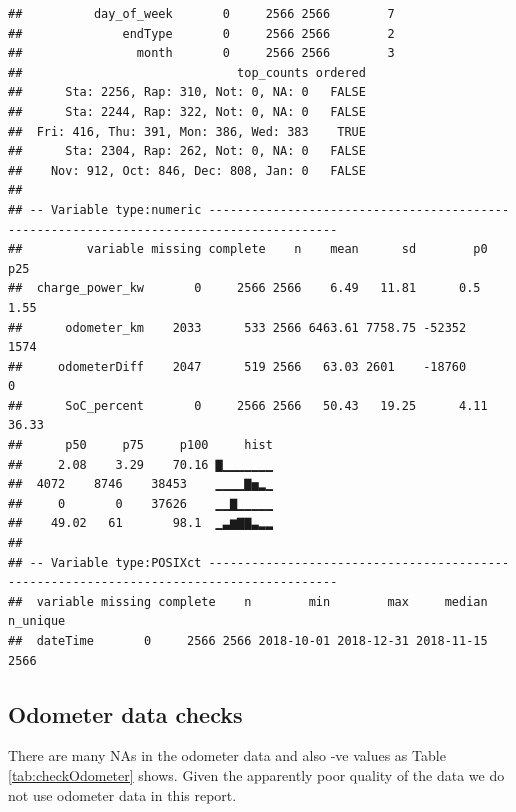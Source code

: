 \documentclass[]{article}
\newenvironment{Shaded}{\begin{snugshade}}{\end{snugshade}}
\newcommand{\DataTypeTok}[1]{\textcolor[rgb]{0.13,0.29,0.53}{#1}}
\newcommand{\DecValTok}[1]{\textcolor[rgb]{0.00,0.00,0.81}{#1}}
\newcommand{\ErrorTok}[1]{\textcolor[rgb]{0.64,0.00,0.00}{\textbf{#1}}}
\newcommand{\KeywordTok}[1]{\textcolor[rgb]{0.13,0.29,0.53}{\textbf{#1}}}
\newcommand{\NormalTok}[1]{#1}
\newcommand{\OperatorTok}[1]{\textcolor[rgb]{0.81,0.36,0.00}{\textbf{#1}}}
\newcommand{\StringTok}[1]{\textcolor[rgb]{0.31,0.60,0.02}{#1}}
\begin{document}
\begin{verbatim}
##          day_of_week       0     2566 2566        7
##              endType       0     2566 2566        2
##                month       0     2566 2566        3
##                              top_counts ordered
##      Sta: 2256, Rap: 310, Not: 0, NA: 0   FALSE
##      Sta: 2244, Rap: 322, Not: 0, NA: 0   FALSE
##  Fri: 416, Thu: 391, Mon: 386, Wed: 383    TRUE
##      Sta: 2304, Rap: 262, Not: 0, NA: 0   FALSE
##    Nov: 912, Oct: 846, Dec: 808, Jan: 0   FALSE
## 
## -- Variable type:numeric ----------------------------------------------------------------------------------------
##         variable missing complete    n    mean      sd        p0     p25
##  charge_power_kw       0     2566 2566    6.49   11.81      0.5     1.55
##      odometer_km    2033      533 2566 6463.61 7758.75 -52352    1574   
##     odometerDiff    2047      519 2566   63.03 2601    -18760       0   
##      SoC_percent       0     2566 2566   50.43   19.25      4.11   36.33
##      p50     p75     p100     hist
##     2.08    3.29    70.16 ▇▁▁▁▁▁▁▁
##  4072    8746    38453    ▁▁▁▁▇▅▂▁
##     0       0    37626    ▁▁▇▁▁▁▁▁
##    49.02   61       98.1  ▁▃▆▇▇▃▂▂
## 
## -- Variable type:POSIXct ----------------------------------------------------------------------------------------
##  variable missing complete    n        min        max     median n_unique
##  dateTime       0     2566 2566 2018-10-01 2018-12-31 2018-11-15     2566
\end{verbatim}

\hypertarget{odometer-data-checks}{%
\subsection{Odometer data checks}\label{odometer-data-checks}}

There are many NAs in the odometer data and also -ve values as Table \ref{tab:checkOdometer} shows. Given the apparently poor quality of the data we do not use odometer data in this report.

\begin{Shaded}
\end{Shaded}
\end{document}
